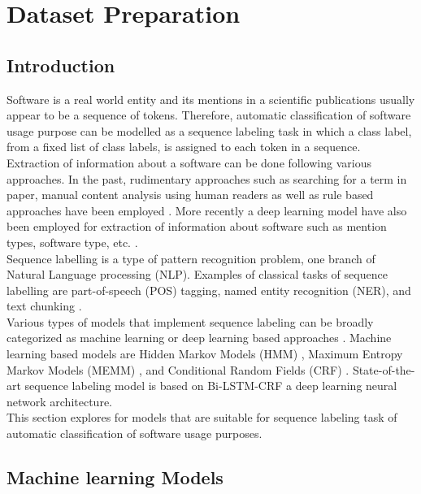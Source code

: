 \chapter{Dataset Preparation }
\label{ch:chapter04}
 
%
%
\section{Introduction}
\label{sec:chapter05:intro}
Software is a real world entity and its mentions in a scientific publications usually appear to be a sequence of tokens.  Therefore, automatic classification of software usage purpose can be modelled as a sequence labeling task in which a class label, from a fixed list of class labels, is assigned to each token in a sequence. \\

Extraction of information about a software can be done following various approaches. In the past, rudimentary approaches such as searching for a term in paper, manual content analysis using human readers as well as rule based approaches have been employed \citep{kruger2019literature}.  More recently a deep learning model have also been employed for extraction of  information about software such as mention types, software type, etc. \citep{schindler2022role}. \\

Sequence labelling is a type of pattern recognition problem, one branch of Natural Language processing (NLP). Examples of classical tasks of sequence labelling are part-of-speech (POS) tagging, named entity recognition (NER), and text chunking \citep{akhundov2018sequence, he2020survey}.  \\

Various types of models that implement sequence labeling can be broadly categorized as machine learning or deep learning based approaches \citep{he2020survey}. Machine learning based models are Hidden Markov Models (HMM) \citep{kupiec1992robust}, Maximum Entropy Markov Models (MEMM) \citep{mccallum2000maximum}, and Conditional Random Fields (CRF) \citep{lafferty2001conditional}.  State-of-the-art sequence labeling model is based on Bi-LSTM-CRF a deep learning neural network architecture. \\

This section explores for models that are suitable for sequence labeling task of automatic classification of software usage purposes. 

\section{Machine learning Models}
\label{sec:chapter05:MLModels}

